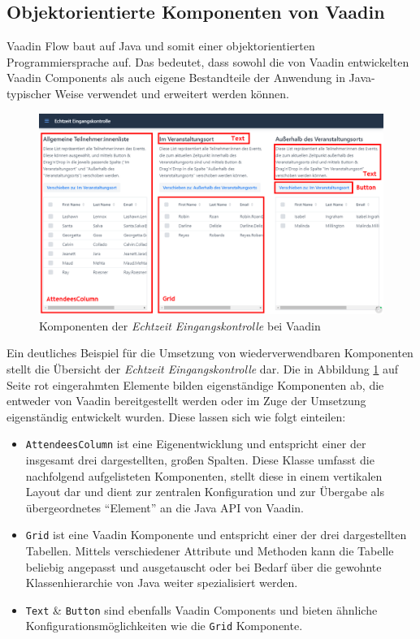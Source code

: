 \documentclass[a4paper,12pt,twoside]{scrreprt}
\begin{document}
\subsection{Objektorientierte Komponenten von Vaadin}
\label{sub-sec:results-wiederverwendbarkeit-vaadin}
Vaadin Flow baut auf Java und somit einer objektorientierten Programmiersprache auf. Das bedeutet, dass sowohl die von Vaadin entwickelten Vaadin Components als auch eigene Bestandteile der Anwendung in Java-typischer Weise verwendet und erweitert werden können.

\begin{figure}[ht]
    \centering
    \includegraphics[scale=0.4]{images/Luidold_Results-Vaadin-Components.png}
    \caption[Komponenten der \textit{Echtzeit Eingangskontrolle} bei Vaadin]{Komponenten der \textit{Echtzeit Eingangskontrolle} bei Vaadin}
    \label{fig:results-vaadin-components}
\end{figure}

Ein deutliches Beispiel für die Umsetzung von wiederverwendbaren Komponenten stellt die Übersicht der \textit{Echtzeit Eingangskontrolle} dar. Die in Abbildung \ref{fig:results-vaadin-components} auf Seite \pageref{fig:results-vaadin-components} rot eingerahmten Elemente bilden eigenständige Komponenten ab, die entweder von Vaadin bereitgestellt werden oder im Zuge der Umsetzung eigenständig entwickelt wurden. Diese lassen sich wie folgt einteilen:

\begin{itemize}
    \item \texttt{AttendeesColumn} ist eine Eigenentwicklung und entspricht einer der insgesamt drei dargestellten, großen Spalten. Diese Klasse umfasst die nachfolgend aufgelisteten Komponenten, stellt diese in einem vertikalen Layout dar und dient zur zentralen Konfiguration und zur Übergabe als übergeordnetes \enquote{Element} an die Java API von Vaadin.
    \item \texttt{Grid} ist eine Vaadin Komponente und entspricht einer der drei dargestellten Tabellen. Mittels verschiedener Attribute und Methoden kann die Tabelle beliebig angepasst und ausgetauscht oder bei Bedarf über die gewohnte Klassenhierarchie von Java weiter spezialisiert werden.
    \item \texttt{Text} \& \texttt{Button} sind ebenfalls Vaadin Components und bieten ähnliche Konfigurationsmöglichkeiten wie die \texttt{Grid} Komponente.
\end{itemize}
\end{document}
